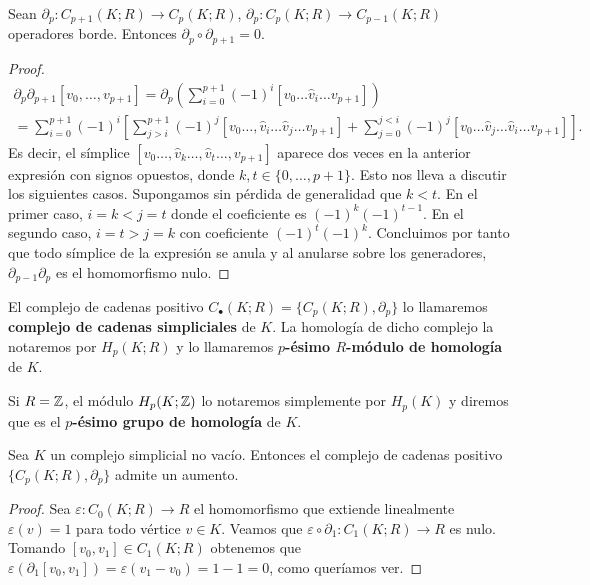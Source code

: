 \begin{lema}
	Sean \(\partial_{p}: C_{p+1}(K;R) \to C_{p}(K;R)\),
	\(\partial_{p}: C_{p}(K;R) \to C_{p-1}(K;R)\) operadores borde. Entonces \(\partial
	_{p}\circ \partial_{p+1}= 0\).
\end{lema}
\begin{proof}
	\begin{gather*}
		\partial_{p}\partial_{p+1}[v_{0}, \ldots, v_{p+1}] = \partial_{p}\left( \sum_{i=0}
		^{p+1}(-1)^{i}[v_{0}\ldots \hat{v}_{i}\ldots v_{p+1}] \right) \\ = \sum_{i=0}
		^{p+1}(-1)^{i}\left[ \sum_{j>i}^{p+1}(-1)^{j}[v_{0}\ldots, \hat{v}_{i}\ldots
		\hat{v}_{j}\ldots v_{p+1}] + \sum_{j=0}^{j<i}(-1)^{j}[v_{0}\ldots \hat{v}_{j}
		\ldots \hat{v}_{i}\ldots v_{p+1}] \right].
	\end{gather*}
	Es decir, el símplice
	\([v_{0}\ldots,\hat{v}_{k}\ldots,\hat{v}_{t}\ldots, v_{p+1}]\) aparece dos veces
	en la anterior expresión con signos opuestos, donde \(k,t \in \{0, \ldots, p+1\}\).
	Esto nos lleva a discutir los siguientes casos. Supongamos sin pérdida de generalidad
	que \(k < t\). En el primer caso, \(i = k < j = t\) donde el coeficiente es \((-1)^{k}
	(-1)^{t-1}\). En el segundo caso, \(i = t > j = k\) con coeficiente \((-1)^{t}(-1)^{k}\).
	Concluimos por tanto que todo símplice de la expresión se anula y al anularse
	sobre los generadores, \(\partial_{p-1}\partial_{p}\) es el homomorfismo nulo.
\end{proof}

\begin{definicion}
	El complejo de cadenas positivo \(C_{\bullet}(K;R) = \{C_{p}(K;R), \partial_{p}\}\)
	lo llamaremos \textbf{complejo de cadenas simpliciales} de \(K\). La homología de
	dicho complejo la notaremos por \(H_{p}(K;R)\) y lo llamaremos \textbf{\(p\)-ésimo
		\(R\)-módulo de homología} de \(K\).
\end{definicion}
Si \(R=\mathbb{Z}\), el módulo \(H_{p}(K;\mathbb{Z})\) lo notaremos simplemente por \(H_{p}(K)\) y diremos
que es el \textbf{\(p\)-ésimo grupo de homología} de \(K\).

\begin{proposicion}
	\label{prop:aumento} Sea \(K\) un complejo simplicial no vacío. Entonces el
	complejo de cadenas positivo \(\{ C_{p}(K;R), \partial_{p}\}\) admite un aumento.
\end{proposicion}
\begin{proof}
	Sea \(\varepsilon: C_{0}(K;R) \to R\) el homomorfismo que extiende linealmente \(\varepsilon
	(v) = 1\) para todo vértice \(v \in K\). Veamos que
	\(\varepsilon \circ \partial_{1}: C_{1}(K;R) \to R\) es nulo. Tomando \([v_{0},v_{1}
	] \in C_{1}(K;R)\) obtenemos que \(\varepsilon (\partial_{1}[v_{0},v_{1}]) = \varepsilon
	(v_{1}- v_{0}) = 1-1 = 0\), como queríamos ver.
\end{proof}

